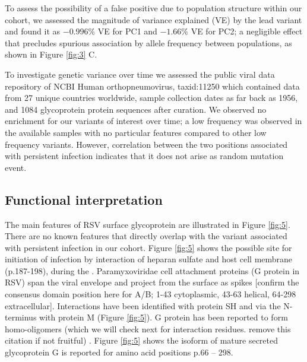 \documentclass{article}
\begin{document}
To assess the possibility of a false positive due to population structure within our cohort,
we assessed the magnitude of variance explained (VE) by the lead variant and found it as 
$-0.996\%$ VE for PC1 and $-1.66\%$ VE for PC2; 
a negligible effect that precludes spurious association by allele frequency between populations, as shown in 
Figure \ref{fig:3} C.


To investigate genetic variance over time
we assessed the public viral data repository of NCBI Human orthopneumovirus, taxid:11250 which contained data from 
27 unique countries worldwide, sample collection dates as far back as 1956, and 1084 glycoprotein protein sequences after curation.
We observed no enrichment for our variants of interest over time; 
a low frequency was observed in the available samples with no particular features compared to other low frequency variants. 
However, correlation between the two positions associated with persistent infection indicates that it does not arise as random mutation event.


\subsection{Functional interpretation}
The main features of RSV surface glycoprotein are illustrated in Figure \ref{fig:5}.
There are no known features that directly overlap with the variant associated with persistent infection in our cohort. 
Figure \ref{fig:5} shows the possible site for  initiation of infection by interaction of heparan sulfate and host cell membrane (p.187-198), during the  \cite{levine1987demonstration, feldman1999identification, feldman2000fusion}.
Paramyxoviridae cell attachment proteins (G protein in RSV) span the viral envelope and project from the surface as spikes 
[confirm the consensus domain position here for A/B; 1-43 cytoplasmic, 43-63 helical, 64-298 extracellular].
Interactions  have been identified with protein SH 
\cite{rixon2005respiratory} 
and via the N-terminus with protein M 
\cite{ghildyal2005interaction} (Figure \ref{fig:5}).
G protein has been reported to form homo-oligomers (which we will check next for interaction residues. remove this citation if not fruitful)
\cite{collins1992oligomerization}.
Figure \ref{fig:5} shows the isoform of mature secreted glycoprotein G is reported for amino acid positions p.66 – 298.
\end{document}
